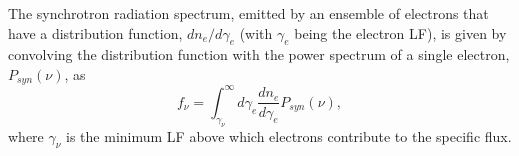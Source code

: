 %
%
The synchrotron radiation spectrum, emitted by an ensemble of electrons that have a 
distribution function, $dn_e/d\gamma_e$ (with $\gamma_e$ being the electron \ac{LF}), 
is given by convolving the distribution function with the power spectrum of a single 
electron, $P_{syn}(\nu)$, as 
%
\begin{equation}
f_{\nu} = \int_{\gamma_{\nu}}^{\infty} d\gamma_e \frac{dn_e}{d\gamma_e}P_{syn}(\nu), 
\label{eq:afterglow:sync_power}
\end{equation}
%
where $\gamma_{\nu}$ is the minimum \ac{LF} above which electrons contribute to the 
specific flux.
%
%
